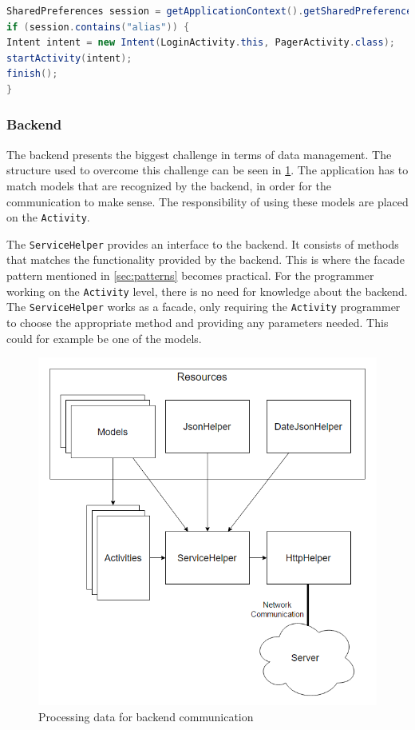 \begin{lstlisting}[language=java, label={lst:login_check}, caption={Checking whether the user should login}]
SharedPreferences session = getApplicationContext().getSharedPreferences(getString(R.string.app_name), 0);
if (session.contains("alias")) {
Intent intent = new Intent(LoginActivity.this, PagerActivity.class);
startActivity(intent);
finish();
}
\end{lstlisting}  

\subsubsection{Backend}
\label{subsubsec:backend}
The backend presents the biggest challenge in terms of data management. The structure used to overcome this challenge can be seen in \ref{fig:application_dataflow}. The application has to match models that are recognized by the backend, in order for the communication to make sense. The responsibility of using these models are placed on the \texttt{Activity}.

The \texttt{ServiceHelper} provides an interface to the backend. It consists of methods that matches the functionality provided by the backend. This is where the facade pattern mentioned in \ref{sec:patterns} becomes practical. For the programmer working on the \texttt{Activity} level, there is no need for knowledge about the backend. The \texttt{ServiceHelper} works as a facade, only requiring the \texttt{Activity} programmer to choose the appropriate method and providing any parameters needed. This could for example be one of the models.

\begin{figure}[H]
	\centering
	\includegraphics[width=\textwidth]{Pictures/application_dataflow.png}
	\caption{Processing data for backend communication}
	\label{fig:application_dataflow}
\end{figure}

